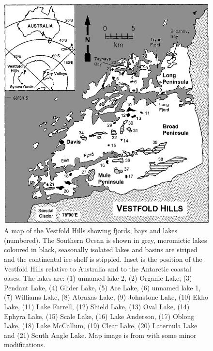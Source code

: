 \begin{figure}
\includegraphics{intro_figures/vestfold_map.png}
\caption[Map of the Vestfold Hills]{A map of the Vestfold Hills showing fjords, bays and lakes (numbered). The Southern Ocean is shown in grey, meromictic lakes coloured in black, seasonally isolated lakes and basins are striped and the continental ice-shelf is stippled. Inset is the position of the Vestfold Hills relative to Australia and to the Antarctic coastal oases. The lakes are: (1) unnamed lake 2, (2) Organic Lake, (3) Pendant Lake, (4) Glider Lake, (5) Ace Lake, (6) unnamed lake 1, (7) Williams Lake, (8) Abraxas Lake, (9) Johnstone Lake, (10) Ekho Lake, (11) Lake Farrell, (12) Shield Lake, (13) Oval Lake, (14) Ephyra Lake, (15) Scale Lake, (16) Lake Anderson, (17) Oblong Lake, (18) Lake McCallum, (19) Clear Lake, (20) Laternula Lake and (21) South Angle Lake. Map image is from \citet{Gibson1999} with some minor modifications.}
\label{fig:vestfold_map}

\end{figure}
